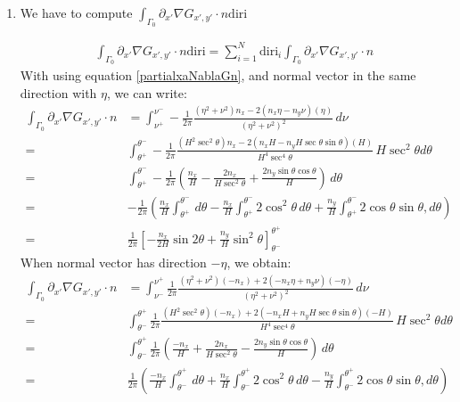 \documentclass[a4paper,12pt]{article}
\newcommand{\integ}[3]{%
\ensuremath{\displaystyle{\int^{#2}_{#1} #3}}}
\begin{document}
\begin{enumerate}
\item We have to compute $\integ{\Gamma_0}{}{\partial_{x'}\nabla G_{x',y'} \cdot n \text{diri}}$

\begin{align}
  \integ{\Gamma_0}{}{\partial_{x'}\nabla G_{x',y'} \cdot n \text{diri}}=\sum\limits_{i=1}^N \text{diri}_i \integ{\Gamma_0}{}{\partial_{x'}\nabla G_{x',y'} \cdot n}
\end{align}
With using equation \ref{partialxaNablaGn}, and normal vector in the same direction with $\eta$, we can write:
\begin{align}
 \integ{\Gamma_0}{}{\partial_{x'}\nabla G_{x',y'} \cdot n}&=\integ{\nu^+}{\nu^-}{-\frac{1}{2\pi} \frac{(\eta^2+\nu^2)n_x-2(n_x\eta-n_y\nu)(\eta)}{(\eta^2+\nu^2)^2} \, d\nu}\\
 =& \integ{\theta^+}{\theta^-}{-\frac{1}{2\pi} \frac{(H^2 \sec^2\theta)n_x-2(n_x H-n_y H \sec \theta \sin \theta)(H)}{H^4 \sec^4\theta} \, H \sec^2\theta d\theta}\\
=&\integ{\theta^+}{\theta^-}{-\frac{1}{2\pi} \left( \frac{n_x}{H}-\frac{2n_x}{H \sec^2\theta}+\frac{2n_y \sin \theta \cos\theta}{H} \right) \, d\theta}\\
=&-\frac{1}{2\pi} \left(\frac{n_x}{H} \integ{\theta^+}{\theta^-}{\, d\theta}-
 \frac{n_x}{H} \integ{\theta^+}{\theta^-}{2\cos^2\theta \, d\theta}+
 \frac{n_y}{H} \integ{\theta^+}{\theta^-}{2\cos \theta \sin\theta, d\theta} \right)\\
=& \frac{1}{2\pi} \left[-\frac{n_x}{2H}\sin2\theta+\frac{n_y}{H}\sin^2\theta \right]_{\theta^-}^{\theta^+}\label{intPartialxaNablaGn}
\end{align}
When normal vector has direction $-\eta$, we obtain:
\begin{align}
 \integ{\Gamma_0}{}{\partial_{x'}\nabla G_{x',y'} \cdot n}&= \integ{\nu^-}{\nu^+}{\frac{1}{2\pi} \frac{(\eta^2+\nu^2)(-n_x)+2(-n_x\eta+n_y\nu)(-\eta)}{(\eta^2+\nu^2)^2} \, d\nu}\\
 =& \integ{\theta^-}{\theta^+}{\frac{1}{2\pi} \frac{(H^2 \sec^2\theta)(-n_x)+2(-n_x H+n_y H \sec \theta \sin \theta)(-H)}{H^4 \sec^4\theta} \, H \sec^2\theta d\theta}\\
=&\integ{\theta^-}{\theta^+}{\frac{1}{2\pi} \left( \frac{-n_x}{H}+\frac{2n_x}{H \sec^2\theta}-\frac{2n_y \sin \theta \cos\theta}{H} \right) \, d\theta}\\
=&\frac{1}{2\pi} \left(\frac{-n_x}{H} \integ{\theta^-}{\theta^+}{\, d\theta}+
 \frac{n_x}{H} \integ{\theta^-}{\theta^+}{2\cos^2\theta \, d\theta}-
 \frac{n_y}{H} \integ{\theta^-}{\theta^+}{2\cos \theta \sin\theta, d\theta} \right)\\

\end{align}
\end{enumerate}
\end{document}
